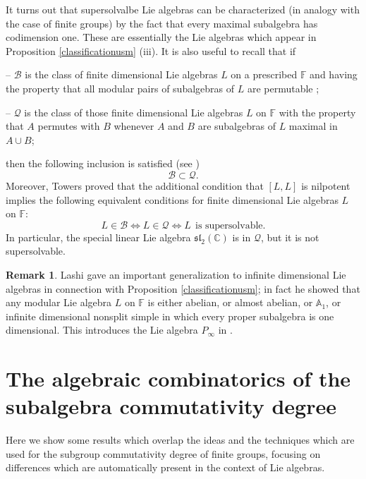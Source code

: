 \documentclass{amsart}
\theoremstyle{definition}
\newtheorem{remark}[theorem]{Remark}
\numberwithin{equation}{section}
\begin{document}
It turns out that supersolvalbe Lie algebras can be characterized (in analogy with the case of finite groups) by the fact that   every maximal subalgebra has codimension one. These are essentially the Lie algebras which appear in Proposition \ref{classificationusm} (iii). It is also useful to recall that if 

\medskip

-- $\mathcal{B}$ is the class of finite dimensional Lie algebras $L$ on a prescribed $\mathbb{F}$ and having the property that all modular pairs of subalgebras of $L$ are permutable ;
\medskip


--  $\mathcal{Q}$ is the class of those finite dimensional Lie algebras $L$ on $\mathbb{F}$ with the property that $A$ permutes with $B$ whenever $A$ and $B$ are subalgebras of $L$  maximal in $A\cup B$; 

\medskip

then the following inclusion is satisfied (see \cite[Corollary 1.3]{david1981}) $$\mathcal{B}\subset \mathcal{Q} .$$ 
Moreover, Towers \cite[Theorem 2.4]{david1981}  proved  that  the additional condition that   $[L,L]$ is nilpotent implies the following equivalent conditions for finite dimensional Lie algebras $L$ on $\mathbb{F}$:  
 $$L\in \mathcal{B} \Longleftrightarrow L\in \mathcal{Q} \Longleftrightarrow L \ \ \mbox{is supersolvable}.$$
 In particular,  the special linear Lie algebra $\mathfrak{sl}_2(\mathbb{C})$ is in   $  \mathcal{Q}$, but it is not supersolvable.  



\begin{remark} \label{generalization}
Lashi \cite[Theorems 1 and 2]{lashi} gave an important generalization to infinite dimensional Lie algebras in connection with Proposition \ref{classificationusm}; in fact he showed that any modular Lie algebra $L$ on  $\mathbb{F}$ is either abelian, or almost abelian,  or $\mathbb{A}_1$, or  infinite dimensional nonsplit simple in which every proper subalgebra is one dimensional. This  introduces the Lie algebra $P_{\infty}$  in \cite{burde1, burde2, lashi, strade1}. \end{remark}


\section{The algebraic combinatorics of the subalgebra commutativity degree}\label{sec3}

Here we show some results which overlap the ideas and the techniques which are used for the subgroup commutativity degree of finite groups, focusing on differences which are automatically present in the context of Lie algebras.
\end{document}
